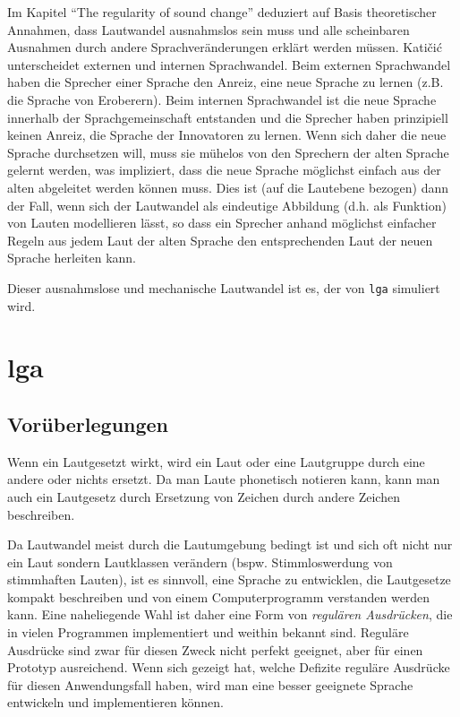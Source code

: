 \documentclass[12pt,a4paper,normalheadings]{scrartcl}
\def\tt#1{\texttt{#1}}
\begin{document}
Im Kapitel ``The regularity of sound change'' deduziert \textcite{katicic}
auf Basis theoretischer Annahmen,
dass Lautwandel ausnahmslos sein muss
und alle scheinbaren Ausnahmen durch andere Sprachveränderungen
erklärt werden müssen.
Katičić unterscheidet externen und internen Sprachwandel.
Beim externen Sprachwandel haben die Sprecher einer Sprache den Anreiz,
eine neue Sprache zu lernen (z.B. die Sprache von Eroberern).
Beim internen Sprachwandel
ist die neue Sprache innerhalb der Sprachgemeinschaft entstanden und
die Sprecher haben prinzipiell keinen Anreiz,
die Sprache der Innovatoren zu lernen.
Wenn sich daher die neue Sprache durchsetzen will,
muss sie mühelos von den Sprechern der alten Sprache gelernt werden,
was impliziert,
dass die neue Sprache möglichst einfach aus der alten abgeleitet werden können muss.
Dies ist (auf die Lautebene bezogen) dann der Fall,
wenn sich der Lautwandel als eindeutige Abbildung (d.h. als Funktion)
von Lauten modellieren lässt,
so dass ein Sprecher anhand möglichst einfacher Regeln
aus jedem Laut der alten Sprache den entsprechenden Laut der neuen Sprache
herleiten kann.

Dieser ausnahmslose und mechanische Lautwandel ist es,
der von \tt{lga} simuliert wird.

\section{lga}

\subsection{Vorüberlegungen}

Wenn ein Lautgesetzt wirkt,
wird ein Laut oder eine Lautgruppe durch eine andere oder nichts ersetzt.
Da man Laute phonetisch notieren kann,
kann man auch ein Lautgesetz durch Ersetzung
von Zeichen durch andere Zeichen beschreiben.

Da Lautwandel meist durch die Lautumgebung bedingt ist
und sich oft nicht nur ein Laut sondern Lautklassen verändern
(bspw. Stimmloswerdung von stimmhaften Lauten),
ist es sinnvoll,
eine Sprache zu entwicklen,
die Lautgesetze kompakt beschreiben
und von einem Computerprogramm verstanden werden kann.
Eine naheliegende Wahl ist daher eine Form von \emph{regulären Ausdrücken},
die in vielen Programmen implementiert und weithin bekannt sind.
Reguläre Ausdrücke sind zwar für diesen Zweck nicht perfekt geeignet,
aber für einen Prototyp ausreichend.
Wenn sich gezeigt hat,
welche Defizite reguläre Ausdrücke für diesen Anwendungsfall haben,
wird man eine besser geeignete Sprache entwickeln und implementieren können.
\end{document}
